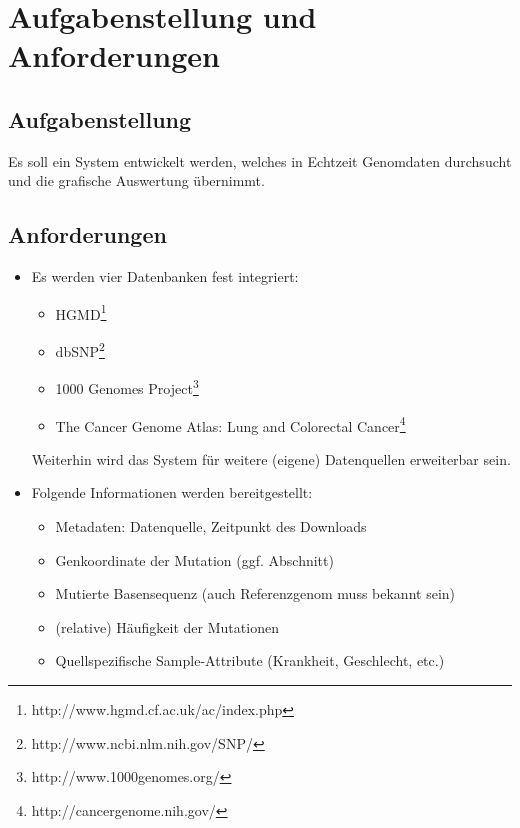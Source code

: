 \documentclass{scrartcl}
\begin{document}
\newpage
\section{Aufgabenstellung und Anforderungen}
\subsection{Aufgabenstellung}
Es soll ein System entwickelt werden, welches in Echtzeit Genomdaten durchsucht und die grafische Auswertung übernimmt. 
\subsection{Anforderungen}
\begin{itemize}

\item Es werden vier Datenbanken fest integriert: 
\begin{itemize}
\item HGMD\footnote{\label{foot:1}http://www.hgmd.cf.ac.uk/ac/index.php}
\item dbSNP\footnote{\label{foot:2}http://www.ncbi.nlm.nih.gov/SNP/}
\item 1000 Genomes Project\footnote{\label{foot:3}http://www.1000genomes.org/}
\item The Cancer Genome Atlas: Lung and Colorectal Cancer\footnote{\label{foot:4}http://cancergenome.nih.gov/}
\end{itemize}
Weiterhin wird das System für weitere (eigene) Datenquellen erweiterbar sein.

\item Folgende Informationen werden bereitgestellt:
\begin{itemize}
\item Metadaten: Datenquelle, Zeitpunkt des Downloads
\item Genkoordinate der Mutation (ggf. Abschnitt)
\item Mutierte Basensequenz (auch Referenzgenom muss bekannt sein)
\item (relative) Häufigkeit der Mutationen
\item Quellspezifische Sample-Attribute (Krankheit, Geschlecht, etc.)
\end{itemize}


\end{itemize}
\end{document}
